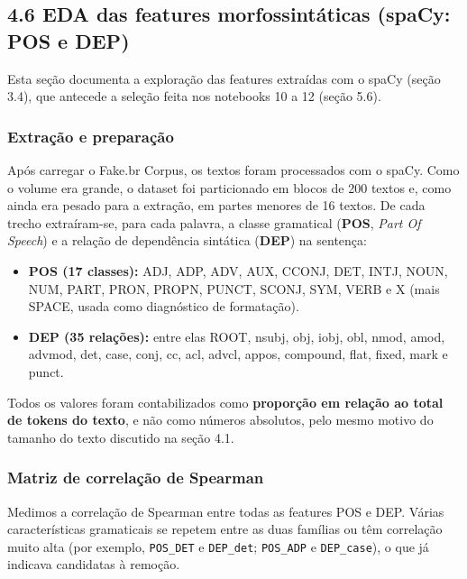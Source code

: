 \documentclass[
  brazilian,
  11pt,
]{article}
\providecommand{\tightlist}{%
  \setlength{\itemsep}{0pt}\setlength{\parskip}{0pt}}
\begin{document}
\subsection{4.6 EDA das features morfossintáticas (spaCy: POS e DEP)}\label{eda-das-features-morfossintuxe1ticas-spacy-pos-e-dep}

Esta seção documenta a exploração das features extraídas com o spaCy (seção 3.4), que antecede a seleção feita nos notebooks 10 a 12 (seção 5.6).

\subsubsection{Extração e preparação}\label{extrauxe7uxe3o-e-preparauxe7uxe3o}

Após carregar o Fake.br Corpus, os textos foram processados com o spaCy. Como o volume era grande, o dataset foi particionado em blocos de 200 textos e, como ainda era pesado para a extração, em partes menores de 16 textos. De cada trecho extraíram-se, para cada palavra, a classe gramatical (\textbf{POS}, \emph{Part Of Speech}) e a relação de dependência sintática (\textbf{DEP}) na sentença:

\begin{itemize}
\tightlist
\item
  \textbf{POS (17 classes):} ADJ, ADP, ADV, AUX, CCONJ, DET, INTJ, NOUN, NUM, PART, PRON, PROPN, PUNCT, SCONJ, SYM, VERB e X (mais SPACE, usada como diagnóstico de formatação).
\item
  \textbf{DEP (35 relações):} entre elas ROOT, nsubj, obj, iobj, obl, nmod, amod, advmod, det, case, conj, cc, acl, advcl, appos, compound, flat, fixed, mark e punct.
\end{itemize}

Todos os valores foram contabilizados como \textbf{proporção em relação ao total de tokens do texto}, e não como números absolutos, pelo mesmo motivo do tamanho do texto discutido na seção 4.1.

\subsubsection{Matriz de correlação de Spearman}\label{matriz-de-correlauxe7uxe3o-de-spearman}

Medimos a correlação de Spearman entre todas as features POS e DEP. Várias características gramaticais se repetem entre as duas famílias ou têm correlação muito alta (por exemplo, \texttt{POS\_DET} e \texttt{DEP\_det}; \texttt{POS\_ADP} e \texttt{DEP\_case}), o que já indicava candidatas à remoção.
\end{document}
